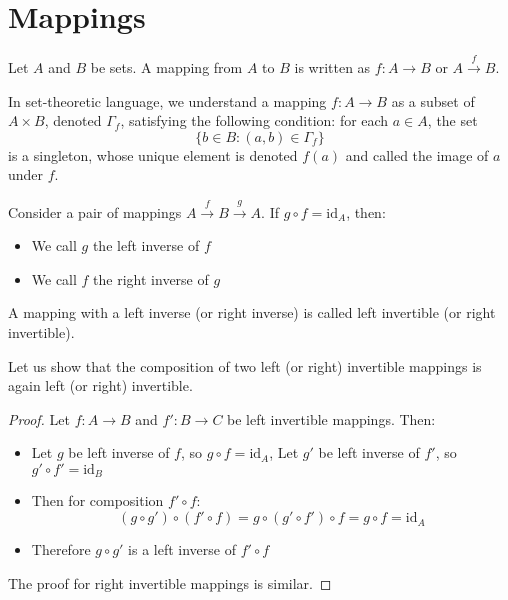 \section{Mappings}

\begin{definition}[Mapping]
  Let $A$ and $B$ be sets. A mapping from $A$ to $B$ is written as $f : A \to B$ or $A \xrightarrow{f} B$.

  In set-theoretic language, we understand a mapping $f : A \to B$ as a subset of $A \times B$, denoted $\Gamma_f$, satisfying the following condition: for each $a \in A$, the set
  \[
    \{b \in B : (a,b) \in \Gamma_f\}
  \]
  is a singleton, whose unique element is denoted $f(a)$ and called the image of $a$ under $f$.
\end{definition}

\begin{definition}
  Consider a pair of mappings $A \xrightarrow{f} B \xrightarrow{g} A$.
  If $g \circ f = \text{id}_A$, then:
  \begin{itemize}
    \item We call $g$ the left inverse of $f$
    \item We call $f$ the right inverse of $g$
  \end{itemize}
  A mapping with a left inverse (or right inverse) is called left invertible (or right invertible).
\end{definition}

\begin{example}
  Let us show that the composition of two left (or right) invertible mappings is again left (or right) invertible.

  \begin{proof}
    Let $f: A \to B$ and $f': B \to C$ be left invertible mappings. Then:
    \begin{itemize}
      \item Let $g$ be left inverse of $f$, so $g \circ f = \text{id}_A$, Let $g'$ be left inverse of $f'$, so $g' \circ f' = \text{id}_B$
      \item Then for composition $f' \circ f$:
        \[
          (g \circ g') \circ (f' \circ f) = g \circ (g' \circ f') \circ f = g \circ f = \text{id}_A
        \]
      \item Therefore $g \circ g'$ is a left inverse of $f' \circ f$
    \end{itemize}
    The proof for right invertible mappings is similar.
  \end{proof}
\end{example}

